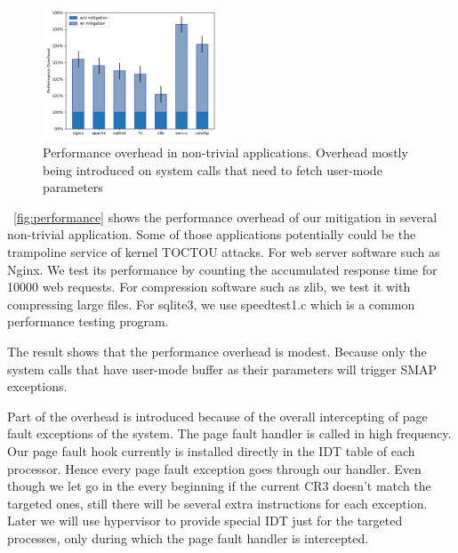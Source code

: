 \begin{figure}[th]
  \includegraphics[width=0.47\textwidth]{figures/performance}
  \centering
  \caption{Performance overhead in non-trivial applications. Overhead mostly being introduced on system calls that need to fetch user-mode parameters}
  \label{fig:performance}
\end{figure}

~\autoref{fig:performance} shows the performance overhead of our mitigation in several non-trivial application. Some of those applications potentially could be the trampoline service of kernel TOCTOU attacks.
For web server software such as Nginx. We test its performance by counting the accumulated response time for 10000 web requests. For compression software such as zlib, we test it with compressing large files. For sqlite3, we use speedtest1.c which is a common performance testing program.

The result shows that the performance overhead is modest. Because only the system calls that have user-mode buffer as their parameters will trigger SMAP exceptions. 




Part of the overhead is introduced because of the overall intercepting of page fault exceptions of the system. The page fault handler is called in high frequency. Our page fault hook currently is installed directly in the IDT table of each processor. Hence every page fault exception goes through our handler. Even though we let go in the every beginning if the current CR3 doesn't match the targeted ones, still there will be several extra instructions for each exception. Later we will use hypervisor to provide special IDT just for the targeted processes, only during which the page fault handler is intercepted.


